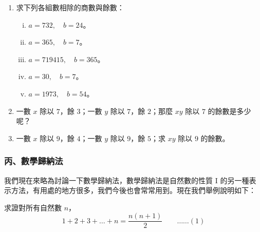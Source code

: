\begin{enumerate}[1., leftmargin=2em]
  \item 求下列各組數相除的商數與餘數：
  \begin{enumerate}[(i)]
    \item $a = 732, \quad b = 24$。
    \item $a = 365, \quad b = 7$。
    \item $a = 719415, \quad b = 365$。
    \item $a = 30, \quad b = 7$。
    \item $a = 1973, \quad b = 54$。
  \end{enumerate}
  \item 一數 $x$ 除以 $7$，餘 $3$；一數 $y$ 除以 $7$，餘 $2$；那麼 $xy$ 除以 $7$ 的餘數是多少呢？
  \item 一數 $x$ 除以 $9$，餘 $4$；一數 $y$ 除以 $9$，餘 $5$；求 $xy$ 除以 $9$ 的餘數。
\end{enumerate}

\subsubsection*{丙、數學歸納法}\label{subsec:induction}

我們現在來略為討論一下數學歸納法，數學歸納法是自然數的性質 I 的另一種表示方法，有用處的地方很多，我們今後也會常常用到。現在我們舉例說明如下：

\begin{example}\label{ex:sum_integers}
求證對所有自然數 $n$，
\begin{equation}\label{eq:sum_n}
  1+2+3+\dots+n = \frac{n(n+1)}{2} \qquad \dots\dots (1)
\end{equation}
\end{example}

